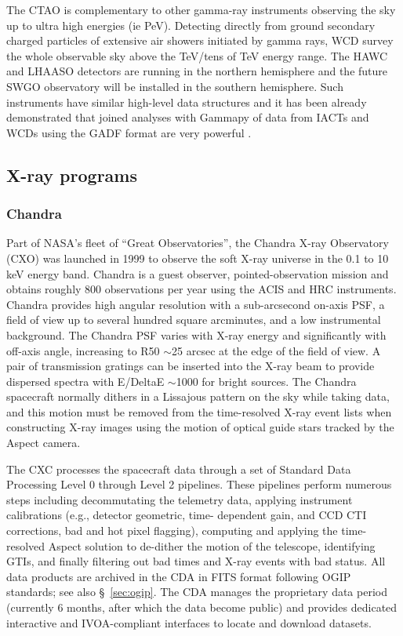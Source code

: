 \documentclass[11pt,a4paper]{ivoa}
\begin{document}
The \gls{CTAO} is complementary to other gamma-ray instruments observing the sky up to ultra high energies (ie PeV).
Detecting directly from ground secondary charged particles of extensive air showers initiated by gamma rays, \gls{WCD} survey the whole observable sky above the TeV/tens of TeV energy range. The HAWC and LHAASO
detectors are running in the northern hemisphere and the future SWGO observatory will be installed in the southern
hemisphere. Such instruments have similar high-level data structures and it has been already demonstrated that joined
analyses with Gammapy of data from \gls{IACT}s and \gls{WCD}s using the GADF format are very powerful \citep{2022A&A...667A..36A}.

\subsection{X-ray programs}

\subsubsection{Chandra}\label{sec:chandra}

Part of \gls{NASA}'s fleet of ``Great Observatories'', the Chandra X-ray Observatory (CXO) was launched in 1999 to observe
the soft X-ray universe in the 0.1 to 10 keV energy band. Chandra is a guest observer, pointed-observation mission and
obtains roughly 800 observations per year using the \gls{ACIS} and \gls{HRC} instruments. Chandra provides high angular resolution with a sub-arcsecond on-axis \gls{PSF},
a field of view up to several hundred square arcminutes, and a low instrumental background. The Chandra \gls{PSF} varies with
X-ray energy and significantly with off-axis angle, increasing to R50 $\sim$25 arcsec at the edge of the field of view.
A pair of transmission gratings can be inserted into the X-ray beam to provide dispersed spectra with E/DeltaE $\sim$1000
for bright sources. The Chandra spacecraft normally dithers in a Lissajous pattern on the sky while taking data, and
this motion must be removed from the time-resolved X-ray event lists when constructing X-ray images using the motion
of optical guide stars tracked by the Aspect camera.

The \gls{CXC} processes the spacecraft data through a set of Standard Data Processing Level 0 through
Level 2 pipelines. These pipelines perform numerous steps including decommutating the telemetry data,
applying instrument calibrations (e.g., detector geometric, time- dependent gain, and CCD \gls{CTI} corrections, bad and hot pixel flagging), computing and applying the time-resolved Aspect solution to de-dither
the motion of the telescope, identifying \gls{GTI}s, and finally filtering out bad times and X-ray events
with bad status. All data products are archived in the \gls{CDA} in \gls{FITS} format following
OGIP standards;  see also \S~\ref{sec:ogip}. The CDA manages the proprietary data period (currently 6 months, after
which the data become public) and provides dedicated interactive and \gls{IVOA}-compliant interfaces to locate and download
datasets.
\end{document}
